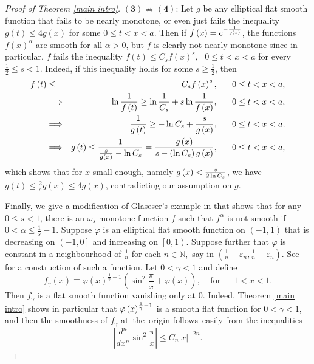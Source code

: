\documentclass{amsart}
\theoremstyle{plain}
\numberwithin{equation}{section}
\begin{document}
\begin{proof}[Proof of Theorem \protect\ref{main intro}]
$\left( \mathbf{3}\right) \mathbf{\nRightarrow }\left( \mathbf{4}\right) $:
Let $g$ be any elliptical flat smooth function that fails to be nearly
monotone, or even just fails the inequality $g\left( t\right) \leq 4g\left(
x\right) $ for some $0\leq t<x<a$. Then if $f\left( x\right) =e^{-\frac{1}{%
g\left( x\right) }}$, the functions $f\left( x\right) ^{\alpha }$ are smooth
for all $\alpha >0$, but $f$ is clearly not nearly monotone since in
particular, $f$ fails the inequality $f\left( t\right) \leq C_{s}f\left(
x\right) ^{s},\ \ \ 0\leq t<x<a$ for every $\frac{1}{2}\leq s<1$. Indeed, if
this inequality holds for some $s\geq \frac{1}{2}$, then 
\begin{eqnarray*}
f\left( t\right) &\leq &C_{s}f\left( x\right) ^{s},\ \ \ \ \ 0\leq t<x<a, \\
&\Longrightarrow &\ln \frac{1}{f\left( t\right) }\geq \ln \frac{1}{C_{s}}%
+s\ln \frac{1}{f\left( x\right) },\ \ \ \ \ 0\leq t<x<a, \\
&\Longrightarrow &\frac{1}{g\left( t\right) }\geq -\ln C_{s}+\frac{s}{%
g\left( x\right) },\ \ \ \ \ 0\leq t<x<a, \\
&\Longrightarrow &g\left( t\right) \leq \frac{1}{\frac{s}{g\left( x\right) }%
-\ln C_{s}}=\frac{g\left( x\right) }{s-\left( \ln C_{s}\right) g\left(
x\right) },\ \ \ \ \ 0\leq t<x<a,
\end{eqnarray*}%
which shows that for $x$ small enough, namely $g\left( x\right) <\frac{s}{%
2\ln C_{s}}$, we have $g\left( t\right) \leq \frac{2}{s}g\left( x\right)
\leq 4g\left( x\right) $, contradicting our assumption on $g$.

Finally, we give a modification of Glaseser's example in \cite{Gla} that
shows that for any $0\leq s<1$, there is an $\omega _{s}$-monotone function $%
f$ such that $f^{\alpha }$ is not smooth if $0<\alpha \leq \frac{1}{s}-1$.
Suppose $\varphi $ is an elliptical flat smooth function on $\left(
-1,1\right) $ that is decreasing on $\left( -1,0\right] $ and increasing on $%
\left[ 0,1\right) $. Suppose further that $\varphi $ is constant in a
neighbourhood of $\frac{1}{n}$ for each $n\in \mathbb{N}$,\ say in $\left( 
\frac{1}{n}-\varepsilon _{n},\frac{1}{n}+\varepsilon _{n}\right) $. See \cite%
[page 206]{Gla} for a construction of such a function. Let $0<\gamma <1$ and
define%
\begin{equation*}
f_{\gamma }\left( x\right) \equiv \varphi \left( x\right) ^{\frac{1}{\gamma }%
-1}\left( \sin ^{2}\frac{\pi }{x}+\varphi \left( x\right) \right) ,\ \ \ \ \ 
\text{for }-1<x<1.
\end{equation*}%
Then $f_{\gamma }$ is a flat smooth function vanishing only at $0$. Indeed,
Theorem \ref{main intro} shows in particular that $\varphi \left( x\right) ^{%
\frac{1}{\gamma }-1}$ is a smooth flat function for $0<\gamma <1$, and then
the smoothness of $f_{\gamma }$ at\ the\ origin follows\ easily from the
inequalities 
\begin{equation*}
\left\vert \frac{d^{n}}{dx^{n}}\sin ^{2}\frac{\pi }{x}\right\vert \leq
C_{n}\left\vert x\right\vert ^{-2n}.
\end{equation*}


\end{proof}
\end{document}
